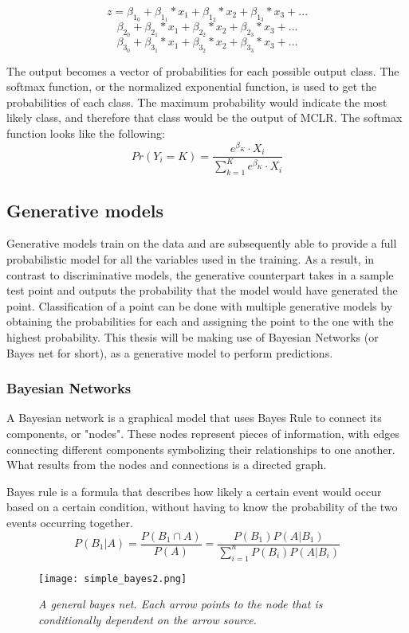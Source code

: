 \documentclass[12pt]{article}
\begin{document}
\[z = \beta_1_0 + \beta_1_1*x_1 + \beta_1_2*x_2 + \beta_1_3*x_3  + ...\]
\[    \beta_2_0 + \beta_2_1*x_1 + \beta_2_2*x_2 + \beta_2_3*x_3  + ...\]
\[    \beta_3_0 + \beta_3_1*x_1 + \beta_3_2*x_2 + \beta_3_3*x_3  + ...\]


The output becomes a vector of probabilities for each possible output class. The softmax function, or the normalized exponential function, is used to get the probabilities of each class. The maximum probability would indicate the most likely class, and therefore that class would be the output of MCLR. The softmax function looks like the following: 
\[Pr(Y_i = K) = \frac{e^{\beta_K} \cdot X_i}{\sum_{k=1}^{K} e^{\beta_K} \cdot X_i}\]

\subsection{Generative models}
Generative models train on the data and are subsequently able to provide a full probabilistic model for all the variables used in the training. As a result, in contrast to discriminative models, the generative counterpart takes in a sample test point and outputs the probability that the model would have generated the point. Classification of a point can be done with multiple generative models by obtaining the probabilities for each and assigning the point to the one with the highest probability. %
This thesis will be making use of Bayesian Networks (or Bayes net for short), as a generative model to perform predictions. 

\subsubsection{Bayesian Networks}
A Bayesian network is a graphical model that uses Bayes Rule to connect its components, or "nodes". These nodes represent pieces of information, with edges connecting different components symbolizing their relationships to one another. What results from the nodes and connections is a directed graph. 

Bayes rule is a formula that describes how likely a certain event would occur based on a certain condition, without having to know the probability of the two events occurring together. 
\[P(B_1|A)=\frac{P(B_1\cap A)}{P(A)}=\frac{P(B_1)P(A| B_1)}{\sum_{i=1}^{n} P(B_i)P(A|B_i)}\]


\begin{figure}[h]
\centering
\texttt{[image: simple\_bayes2.png]}
\caption{\textit{A general bayes net. Each arrow points to the node that is conditionally dependent on the arrow source.}}
\end{figure}
\end{document}
